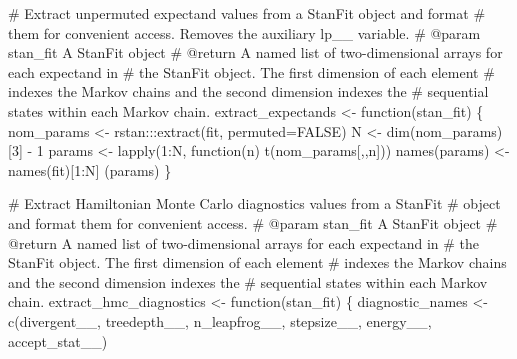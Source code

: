 \documentclass[
  letterpaper,
  DIV=11,
  numbers=noendperiod]{scrartcl}
\newenvironment{Shaded}{\begin{snugshade}}{\end{snugshade}}
\newcommand{\AttributeTok}[1]{\textcolor[rgb]{0.40,0.45,0.13}{#1}}
\newcommand{\CommentTok}[1]{\textcolor[rgb]{0.37,0.37,0.37}{#1}}
\newcommand{\ConstantTok}[1]{\textcolor[rgb]{0.56,0.35,0.01}{#1}}
\newcommand{\ControlFlowTok}[1]{\textcolor[rgb]{0.00,0.23,0.31}{#1}}
\newcommand{\DecValTok}[1]{\textcolor[rgb]{0.68,0.00,0.00}{#1}}
\newcommand{\FunctionTok}[1]{\textcolor[rgb]{0.28,0.35,0.67}{#1}}
\newcommand{\NormalTok}[1]{\textcolor[rgb]{0.00,0.23,0.31}{#1}}
\newcommand{\OtherTok}[1]{\textcolor[rgb]{0.00,0.23,0.31}{#1}}
\newcommand{\SpecialCharTok}[1]{\textcolor[rgb]{0.37,0.37,0.37}{#1}}
\newcommand{\StringTok}[1]{\textcolor[rgb]{0.13,0.47,0.30}{#1}}
\begin{document}
\begin{Shaded}
\begin{Highlighting}[]
\CommentTok{\# Extract unpermuted expectand values from a StanFit object and format }
\CommentTok{\# them for convenient access.  Removes the auxiliary \textasciigrave{}lp\_\_\textasciigrave{} variable.}
\CommentTok{\# @param stan\_fit A StanFit object}
\CommentTok{\# @return A named list of two{-}dimensional arrays for each expectand in }
\CommentTok{\#         the StanFit object.  The first dimension of each element }
\CommentTok{\#         indexes the Markov chains and the second dimension indexes the }
\CommentTok{\#         sequential states within each Markov chain. }
\NormalTok{extract\_expectands }\OtherTok{\textless{}{-}} \ControlFlowTok{function}\NormalTok{(stan\_fit) \{}
\NormalTok{  nom\_params }\OtherTok{\textless{}{-}}\NormalTok{ rstan}\SpecialCharTok{:::}\FunctionTok{extract}\NormalTok{(fit, }\AttributeTok{permuted=}\ConstantTok{FALSE}\NormalTok{)}
\NormalTok{  N }\OtherTok{\textless{}{-}} \FunctionTok{dim}\NormalTok{(nom\_params)[}\DecValTok{3}\NormalTok{] }\SpecialCharTok{{-}} \DecValTok{1}
\NormalTok{  params }\OtherTok{\textless{}{-}} \FunctionTok{lapply}\NormalTok{(}\DecValTok{1}\SpecialCharTok{:}\NormalTok{N, }\ControlFlowTok{function}\NormalTok{(n) }\FunctionTok{t}\NormalTok{(nom\_params[,,n]))}
  \FunctionTok{names}\NormalTok{(params) }\OtherTok{\textless{}{-}} \FunctionTok{names}\NormalTok{(fit)[}\DecValTok{1}\SpecialCharTok{:}\NormalTok{N]}
\NormalTok{  (params)}
\NormalTok{\}}

\CommentTok{\# Extract Hamiltonian Monte Carlo diagnostics values from a StanFit}
\CommentTok{\# object and format them for convenient access.}
\CommentTok{\# @param stan\_fit A StanFit object}
\CommentTok{\# @return A named list of two{-}dimensional arrays for each expectand in }
\CommentTok{\#         the StanFit object.  The first dimension of each element }
\CommentTok{\#         indexes the Markov chains and the second dimension indexes the }
\CommentTok{\#         sequential states within each Markov chain. }
\NormalTok{extract\_hmc\_diagnostics }\OtherTok{\textless{}{-}} \ControlFlowTok{function}\NormalTok{(stan\_fit) \{}
\NormalTok{  diagnostic\_names }\OtherTok{\textless{}{-}} \FunctionTok{c}\NormalTok{(}\StringTok{\textquotesingle{}divergent\_\_\textquotesingle{}}\NormalTok{, }\StringTok{\textquotesingle{}treedepth\_\_\textquotesingle{}}\NormalTok{, }\StringTok{\textquotesingle{}n\_leapfrog\_\_\textquotesingle{}}\NormalTok{, }
                        \StringTok{\textquotesingle{}stepsize\_\_\textquotesingle{}}\NormalTok{, }\StringTok{\textquotesingle{}energy\_\_\textquotesingle{}}\NormalTok{, }\StringTok{\textquotesingle{}accept\_stat\_\_\textquotesingle{}}\NormalTok{)}


\end{Highlighting}
\end{Shaded}
\end{document}
